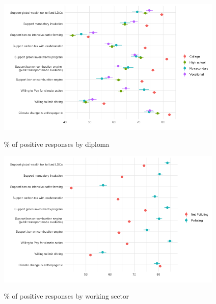 	\begin{frame}{}%
	\begin{figure}[h!]
	\caption{\% of positive responses by diploma}
	\includegraphics[width=.7\paperwidth]{../figures/country_comparison/main_var_by_country_diploma_all.png} \\
	\end{figure}
	\end{frame}
	
	\begin{frame}{}%
	\begin{figure}[h!]
	\caption{\% of positive responses by working sector}
	\includegraphics[width=.7\paperwidth]{../figures/country_comparison/main_var_by_country_polluting_sector_all.png} \\
	\end{figure}
	\end{frame}
	
